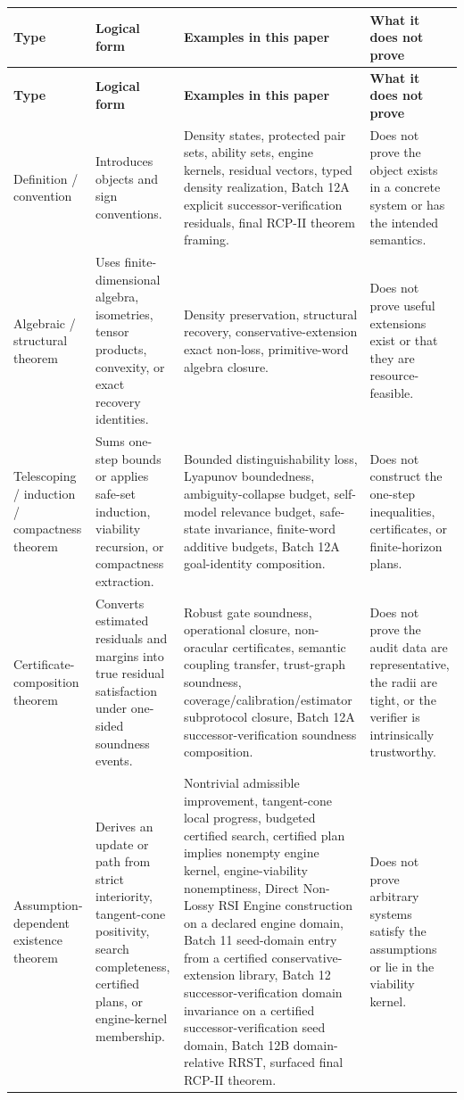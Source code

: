 \documentclass[11pt]{article}
\newcommand{\1}{\mathbf{1}}
\begin{document}
\begin{longtable}{@{}>{\raggedright\arraybackslash}p{}>{\raggedright\arraybackslash}p{}>{\raggedright\arraybackslash}p{}>{\raggedright\arraybackslash}p{}@{}}
\toprule
\textbf{Type} & \textbf{Logical form} & \textbf{Examples in this paper} & \textbf{What it does not prove}\\
\midrule
\endfirsthead
\toprule
\textbf{Type} & \textbf{Logical form} & \textbf{Examples in this paper} & \textbf{What it does not prove}\\
\midrule
\endhead
\bottomrule
\endfoot
Definition / convention & Introduces objects and sign conventions. & Density states, protected pair sets, ability sets, engine kernels, residual vectors, typed density realization, Batch 12A explicit successor-verification residuals, final RCP-II theorem framing. & Does not prove the object exists in a concrete system or has the intended semantics.\\
\midrule
Algebraic / structural theorem & Uses finite-dimensional algebra, isometries, tensor products, convexity, or exact recovery identities. & Density preservation, structural recovery, conservative-extension exact non-loss, primitive-word algebra closure. & Does not prove useful extensions exist or that they are resource-feasible.\\
\midrule
Telescoping / induction / compactness theorem & Sums one-step bounds or applies safe-set induction, viability recursion, or compactness extraction. & Bounded distinguishability loss, Lyapunov boundedness, ambiguity-collapse budget, self-model relevance budget, safe-state invariance, finite-word additive budgets, Batch 12A goal-identity composition. & Does not construct the one-step inequalities, certificates, or finite-horizon plans.\\
\midrule
Certificate-composition theorem & Converts estimated residuals and margins into true residual satisfaction under one-sided soundness events. & Robust gate soundness, operational closure, non-oracular certificates, semantic coupling transfer, trust-graph soundness, coverage/calibration/estimator subprotocol closure, Batch 12A successor-verification soundness composition. & Does not prove the audit data are representative, the radii are tight, or the verifier is intrinsically trustworthy.\\
\midrule
Assumption-dependent existence theorem & Derives an update or path from strict interiority, tangent-cone positivity, search completeness, certified plans, or engine-kernel membership. & Nontrivial admissible improvement, tangent-cone local progress, budgeted certified search, certified plan implies nonempty engine kernel, engine-viability nonemptiness, Direct Non-Lossy RSI Engine construction on a declared engine domain, Batch 11 seed-domain entry from a certified conservative-extension library, Batch 12 successor-verification domain invariance on a certified successor-verification seed domain, Batch 12B domain-relative RRST, surfaced final RCP-II theorem. & Does not prove arbitrary systems satisfy the assumptions or lie in the viability kernel.\\

\end{longtable}
\end{document}
